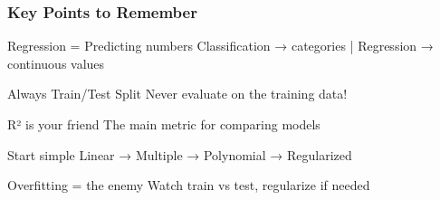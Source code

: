 \documentclass{beamer}
\begin{document}
\begin{frame}
\frametitle{Key Points to Remember}
\begin{block}{Regression = Predicting numbers}
Classification → categories | Regression → continuous values
\end{block}


\begin{block}{Always Train/Test Split}
Never evaluate on the training data!
\end{block}


\begin{block}{R² is your friend}
The main metric for comparing models
\end{block}

\begin{block}{Start simple}
Linear → Multiple → Polynomial → Regularized
\end{block}

\begin{block}{Overfitting = the enemy}
Watch train vs test, regularize if needed
\end{block}
\end{frame}
\end{document}
